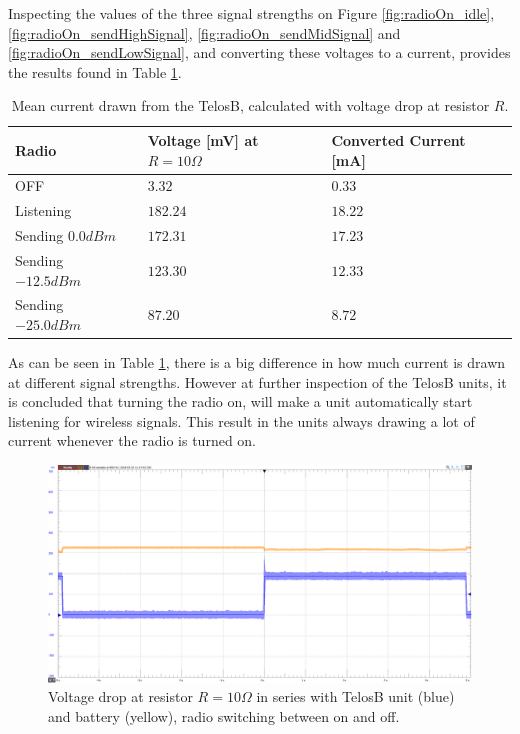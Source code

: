 \noindent Inspecting the values of the three signal strengths on Figure \ref{fig:radioOn_idle}, \ref{fig:radioOn_sendHighSignal}, \ref{fig:radioOn_sendMidSignal} and \ref{fig:radioOn_sendLowSignal}, and converting these voltages to a current, provides the results found in Table \ref{tab:signalStrengthEnergyConsumption}.

\begin{table}[H]
	\centering
	\begin{tabularx}{\linewidth}{|X|X|X|}
		\hline
		Radio				& Voltage [mV] at $R=10\Omega$	& Converted Current [mA]	\\ \hline
		OFF					& $3.32$						& $0.33$					\\ \hline
		Listening			& $182.24$						& $18.22$					\\ \hline
		Sending $0.0dBm$	& $172.31$						& $17.23$					\\ \hline
		Sending $-12.5dBm$	& $123.30$						& $12.33$					\\ \hline
		Sending $-25.0dBm$	& $87.20$						& $8.72$					\\ \hline
	\end{tabularx}
	\caption{Mean current drawn from the TelosB, calculated with voltage drop at resistor $R$.}
	\label{tab:signalStrengthEnergyConsumption}
\end{table}

\noindent As can be seen in Table \ref{tab:signalStrengthEnergyConsumption}, there is a big difference in how much current is drawn at different signal strengths. However at further inspection of the TelosB units, it is concluded that turning the radio on, will make a unit automatically start listening for wireless signals. This result in the units always drawing a lot of current whenever the radio is turned on.

\begin{figure}[H]
	\centering
	\includegraphics[width=\linewidth]{implementation/energylab/fig/radioSwitching.png}
	\caption{Voltage drop at resistor $R=10\Omega$ in series with TelosB unit (blue) and battery (yellow), radio switching between on and off.}
	\label{fig:radioSwitching}
\end{figure}

